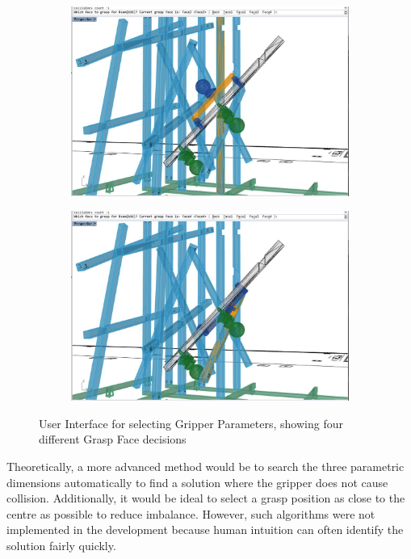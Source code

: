 \begin{figure}[!h]
\begin{subfigure}[b]{0.49\textwidth}
        \includegraphics[width=\textwidth]{images/6a/img28.jpg}
    \end{subfigure}
    \hfill
    \begin{subfigure}[b]{0.49\textwidth}
        \centering
        \includegraphics[width=\textwidth]{images/6a/img29.jpg}
    \end{subfigure}
    \caption{User Interface for selecting Gripper Parameters, showing four different Grasp Face decisions}
    \label{fig:ui-for-selecting-gripper-parameters}
\end{figure}

Theoretically, a more advanced method would be to search the three parametric dimensions automatically to find a solution where the gripper does not cause collision. Additionally, it would be ideal to select a grasp position as close to the centre as possible to reduce imbalance. However, such algorithms were not implemented in the development because human intuition can often identify the solution fairly quickly.


